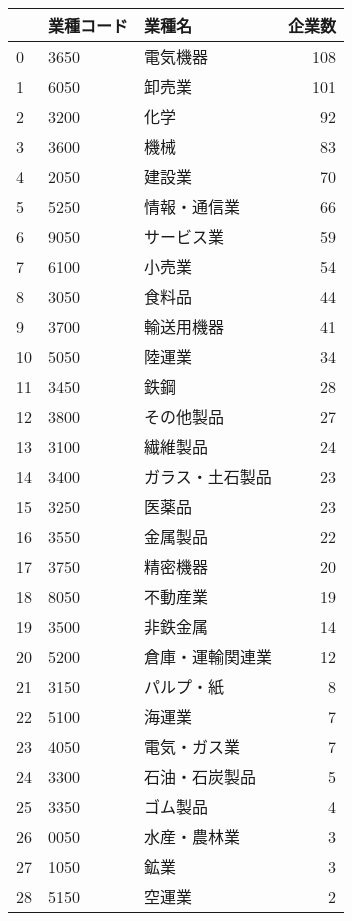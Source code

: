 \begin{tabular}{lllr}
\toprule
{} & 業種コード &       業種名 &  企業数 \\
\midrule
0  &  3650 &      電気機器 &  108 \\
1  &  6050 &       卸売業 &  101 \\
2  &  3200 &        化学 &   92 \\
3  &  3600 &        機械 &   83 \\
4  &  2050 &       建設業 &   70 \\
5  &  5250 &    情報・通信業 &   66 \\
6  &  9050 &     サービス業 &   59 \\
7  &  6100 &       小売業 &   54 \\
8  &  3050 &       食料品 &   44 \\
9  &  3700 &     輸送用機器 &   41 \\
10 &  5050 &       陸運業 &   34 \\
11 &  3450 &        鉄鋼 &   28 \\
12 &  3800 &     その他製品 &   27 \\
13 &  3100 &      繊維製品 &   24 \\
14 &  3400 &  ガラス・土石製品 &   23 \\
15 &  3250 &       医薬品 &   23 \\
16 &  3550 &      金属製品 &   22 \\
17 &  3750 &      精密機器 &   20 \\
18 &  8050 &      不動産業 &   19 \\
19 &  3500 &      非鉄金属 &   14 \\
20 &  5200 &  倉庫・運輸関連業 &   12 \\
21 &  3150 &     パルプ・紙 &    8 \\
22 &  5100 &       海運業 &    7 \\
23 &  4050 &    電気・ガス業 &    7 \\
24 &  3300 &   石油・石炭製品 &    5 \\
25 &  3350 &      ゴム製品 &    4 \\
26 &  0050 &    水産・農林業 &    3 \\
27 &  1050 &        鉱業 &    3 \\
28 &  5150 &       空運業 &    2 \\
\bottomrule
\end{tabular}
